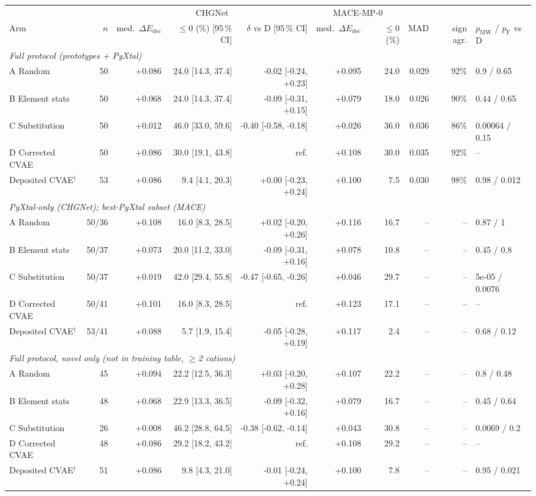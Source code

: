 \begin{tabular}{lrrrrrrrrl}
\toprule
 & & \multicolumn{3}{c}{CHGNet} & \multicolumn{2}{c}{MACE-MP-0} & & & \\
\cmidrule(lr){3-5}\cmidrule(lr){6-7}
Arm & $n$ & med.\ $\Delta E_\mathrm{dec}$ & $\le 0$ (\%) [95\,\% CI] & $\delta$ vs D [95\,\% CI] & med.\ $\Delta E_\mathrm{dec}$ & $\le 0$ (\%) & MAD & sign agr. & $p_\mathrm{MW}$ / $p_\mathrm{F}$ vs D \\
\midrule
\multicolumn{10}{l}{\emph{Full protocol (prototypes + PyXtal)}} \\
A Random & 50 & +0.086 & 24.0 [14.3, 37.4] & -0.02 [-0.24, +0.23] & +0.095 & 24.0 & 0.029 & 92\% & 0.9 / 0.65 \\
B Element stats & 50 & +0.068 & 24.0 [14.3, 37.4] & -0.09 [-0.31, +0.15] & +0.079 & 18.0 & 0.026 & 90\% & 0.44 / 0.65 \\
C Substitution & 50 & +0.012 & 46.0 [33.0, 59.6] & -0.40 [-0.58, -0.18] & +0.026 & 36.0 & 0.036 & 86\% & 0.00064 / 0.15 \\
D Corrected CVAE & 50 & +0.086 & 30.0 [19.1, 43.8] & ref. & +0.108 & 30.0 & 0.035 & 92\% & -- \\
Deposited CVAE$^\dagger$ & 53 & +0.086 & 9.4 [4.1, 20.3] & +0.00 [-0.23, +0.24] & +0.100 & 7.5 & 0.030 & 98\% & 0.98 / 0.012 \\
\midrule
\multicolumn{10}{l}{\emph{PyXtal-only (CHGNet); best-PyXtal subset (MACE)}} \\
A Random & 50/36 & +0.108 & 16.0 [8.3, 28.5] & +0.02 [-0.20, +0.26] & +0.116 & 16.7 & -- & -- & 0.87 / 1 \\
B Element stats & 50/37 & +0.073 & 20.0 [11.2, 33.0] & -0.09 [-0.31, +0.16] & +0.078 & 10.8 & -- & -- & 0.45 / 0.8 \\
C Substitution & 50/37 & +0.019 & 42.0 [29.4, 55.8] & -0.47 [-0.65, -0.26] & +0.046 & 29.7 & -- & -- & 5e-05 / 0.0076 \\
D Corrected CVAE & 50/41 & +0.101 & 16.0 [8.3, 28.5] & ref. & +0.123 & 17.1 & -- & -- & -- \\
Deposited CVAE$^\dagger$ & 53/41 & +0.088 & 5.7 [1.9, 15.4] & -0.05 [-0.28, +0.19] & +0.117 & 2.4 & -- & -- & 0.68 / 0.12 \\
\midrule
\multicolumn{10}{l}{\emph{Full protocol, novel only (not in training table, $\geq$2 cations)}} \\
A Random & 45 & +0.094 & 22.2 [12.5, 36.3] & +0.03 [-0.20, +0.28] & +0.107 & 22.2 & -- & -- & 0.8 / 0.48 \\
B Element stats & 48 & +0.068 & 22.9 [13.3, 36.5] & -0.09 [-0.32, +0.16] & +0.079 & 16.7 & -- & -- & 0.45 / 0.64 \\
C Substitution & 26 & +0.008 & 46.2 [28.8, 64.5] & -0.38 [-0.62, -0.14] & +0.043 & 30.8 & -- & -- & 0.0069 / 0.2 \\
D Corrected CVAE & 48 & +0.086 & 29.2 [18.2, 43.2] & ref. & +0.108 & 29.2 & -- & -- & -- \\
Deposited CVAE$^\dagger$ & 51 & +0.086 & 9.8 [4.3, 21.0] & -0.01 [-0.24, +0.24] & +0.100 & 7.8 & -- & -- & 0.95 / 0.021 \\
\bottomrule
\end{tabular}
